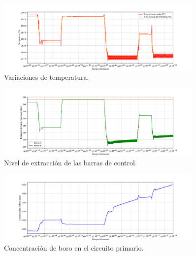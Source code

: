 \begin{figure}[!h]
  \centering
  \includegraphics[width=0.9\textwidth]{content/figures/sim4_temperaturas.pdf}
  \vspace{-0.1cm}
  \caption{Variaciones de temperatura.}
  \label{fig:sim4_temperaturas}
\end{figure}

\begin{figure}[!h]
  \vspace{-0.2cm}
  \centering
  \includegraphics[width=0.9\textwidth]{content/figures/sim4_barras_control.pdf}
  \vspace{-0.1cm}
  \caption{Nivel de extracción de las barras de control.}
  \label{fig:sim4_barras_control}
\end{figure}

\begin{figure}[!h]
  \vspace{-0.2cm}
  \centering
  \includegraphics[width=0.9\textwidth]{content/figures/sim4_boro.pdf}
  \vspace{-0.1cm}
  \caption{Concentración de boro en el circuito primario.}
  \label{fig:sim4_boro}
\end{figure}

